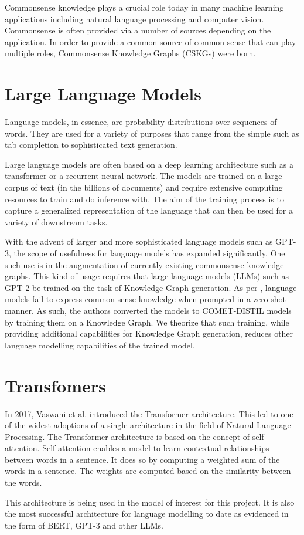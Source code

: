 \documentclass[\main/thesis.tex]{subfiles}
\begin{document}
Commonsense knowledge plays a crucial role today in many machine learning applications including
natural language processing and computer vision. Commonsense is often provided via a number 
of sources depending on the application. In order to provide a common source of common sense that can play
multiple roles, Commonsense Knowledge Graphs (CSKGs) were born\cite{ilievski_cskg_2021}.


\section{Large Language Models}\label{sec:largeLanguageModel}

Language models, in essence, are probability distributions over sequences of words\cite{jurafsky_speech_2009}. 
They are used for a variety of purposes that range from the simple such as tab completion to 
sophisticated text generation. 

Large language models are often based on a deep learning architecture such as a transformer
or a recurrent neural network. The models are trained on a large corpus of text 
(in the billions of documents) and require extensive computing resources to train and 
do inference with. The aim of the training process is to capture a generalized 
representation of the language that can then be used for a variety of downstream tasks. 

With the advent of larger and more sophisticated language models such as GPT-3\cite{brown_language_2020}, the scope
of usefulness for language models has expanded significantly. One such use is in the 
augmentation of currently existing commonsense knowledge graphs\cite{west_symbolic_2021}.
This kind of usage requires that large language models (LLMs) such as GPT-2 be trained on the task
of Knowledge Graph generation. As per \citeauthor{west_symbolic_2021}, language models fail to express common 
sense knowledge when prompted in a zero-shot manner. As such, the authors converted the models
to COMET-DISTIL models by training them on a Knowledge Graph. We theorize that such training, while providing 
additional capabilities for Knowledge Graph generation, reduces other language modelling capabilities
of the trained model. 

\section{Transfomers}\label{sec:transformers}
In 2017, Vaswani et al. introduced the Transformer architecture\cite{vaswani2017attention}. 
This led to one of the widest adoptions of a single architecture in the field of Natural Language
Processing. The Transformer architecture is based on the concept of self-attention. 
Self-attention enables a model to learn contextual relationships between words in a sentence.
It does so by computing a weighted sum of the words in a sentence. The weights are computed
based on the similarity between the words. 

This architecture is being used in the model of interest for this project. It is also 
the most successful architecture for language modelling to date as evidenced in the form
of BERT, GPT-3 and other LLMs.
\end{document}
